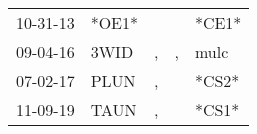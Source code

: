 \begin{supertabular}{lllll}
 10-31-13 &  *OE1* &    &    &  *CE1* \\
 09-04-16 &   3WID &  , &  , &   mulc \\
 07-02-17 &   PLUN &  , &    &  *CS2* \\
 11-09-19 &   TAUN &  , &    &  *CS1* \\
\end{supertabular}
